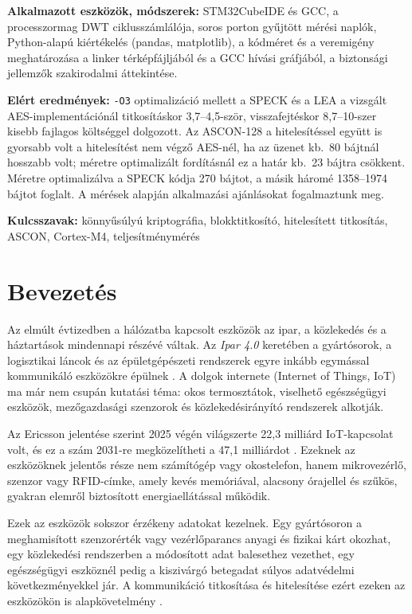 \documentclass[a4paper,12pt]{report}
\theoremstyle{definition}
\theoremstyle{remark}
\begin{document}
\smallskip
\noindent\textbf{Alkalmazott eszközök, módszerek:} STM32CubeIDE és GCC, a processzormag DWT ciklusszámlálója, soros porton gyűjtött mérési naplók, Python-alapú kiértékelés (pandas, matplotlib), a kódméret és a veremigény meghatározása a linker térképfájljából és a GCC hívási gráfjából, a biztonsági jellemzők szakirodalmi áttekintése.

\smallskip
\noindent\textbf{Elért eredmények:} \texttt{-O3} optimalizáció mellett a SPECK és a LEA a vizsgált AES-implementációnál titkosításkor 3,7--4,5-ször, visszafejtéskor 8,7--10-szer kisebb fajlagos költséggel dolgozott. Az ASCON-128 a hitelesítéssel együtt is gyorsabb volt a hitelesítést nem végző AES-nél, ha az üzenet kb.\ 80 bájtnál hosszabb volt; méretre optimalizált fordításnál ez a határ kb.\ 23 bájtra csökkent. Méretre optimalizálva a SPECK kódja 270 bájtot, a másik háromé 1358--1974 bájtot foglalt. A mérések alapján alkalmazási ajánlásokat fogalmaztunk meg.

\smallskip
\noindent\textbf{Kulcsszavak:} könnyűsúlyú kriptográfia, blokktitkosító, hitelesített titkosítás, ASCON, Cortex-M4, teljesítménymérés

\tableofcontents

\chapter{Bevezetés}

Az elmúlt évtizedben a hálózatba kapcsolt eszközök az ipar, a közlekedés és a háztartások mindennapi részévé váltak. Az \emph{Ipar 4.0} keretében a gyártósorok, a logisztikai láncok és az épületgépészeti rendszerek egyre inkább egymással kommunikáló eszközökre épülnek \cite{Sadeghi2015}. A dolgok internete (Internet of Things, IoT) ma már nem csupán kutatási téma: okos termosztátok, viselhető egészségügyi eszközök, mezőgazdasági szenzorok és közlekedésirányító rendszerek alkotják.

Az Ericsson jelentése szerint 2025 végén világszerte 22,3 milliárd IoT-kapcsolat volt, és ez a szám 2031-re megközelítheti a 47,1 milliárdot \cite{Ericsson2026}. Ezeknek az eszközöknek jelentős része nem számítógép vagy okostelefon, hanem mikrovezérlő, szenzor vagy RFID-címke, amely kevés memóriával, alacsony órajellel és szűkös, gyakran elemről biztosított energiaellátással működik.

Ezek az eszközök sokszor érzékeny adatokat kezelnek. Egy gyártósoron a meghamisított szenzorérték vagy vezérlőparancs anyagi és fizikai kárt okozhat, egy közlekedési rendszerben a módosított adat balesethez vezethet, egy egészségügyi eszköznél pedig a kiszivárgó betegadat súlyos adatvédelmi következményekkel jár. A kommunikáció titkosítása és hitelesítése ezért ezeken az eszközökön is alapkövetelmény \cite{Hossain2015}.
\end{document}
